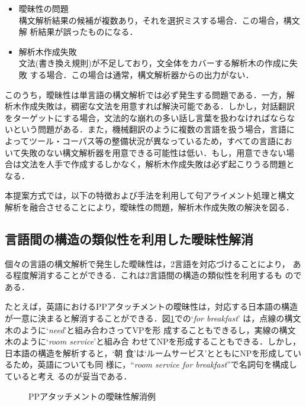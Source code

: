 \begin{itemize}\itemsep=0mm
\item 曖昧性の問題 \\
構文解析結果の候補が複数あり，それを選択ミスする場合．この場合，構文解
析結果が誤ったものになる．

\item 解析木作成失敗 \\
文法(書き換え規則)が不足しており，文全体をカバーする解析木の作成に失敗
する場合．この場合は通常，構文解析器からの出力がない．
\end{itemize}

このうち，曖昧性は単言語の構文解析では必ず発生する問題である．一方，解
析木作成失敗は，稠密な文法を用意すれば解決可能である．しかし，対話翻訳
をターゲットにする場合，文法的な崩れの多い話し言葉を扱わなければならな
いという問題がある．また，機械翻訳のように複数の言語を扱う場合，言語に
よってツール・コーパス等の整備状況が異なっているため，すべての言語にお
いて失敗のない構文解析器を用意できる可能性は低い．もし，用意できない場
合は文法を人手で作成するしかなく，解析木作成失敗は必ず起こりうる問題と
なる．

本提案方式では，以下の特徴および手法を利用して句アライメント処理と構文
解析を融合させることにより，曖昧性の問題，解析木作成失敗の解決を図る．


\subsection{言語間の構造の類似性を利用した曖昧性解消}
\label{sec-disambiguation}

個々の言語の構文解析で発生した曖昧性は，2言語を対応づけることにより，
ある程度解消することができる．これは2言語間の構造の類似性を利用するも
のである\cite{Kaji:PhraseAlignment1992,Matsumoto:PhraseAlignment1993}．

たとえば，英語におけるPPアタッチメントの曖昧性は，対応する日本語の構造
が一意に決まると解消することができる．図\ref{fig-pp}での`{\em for
breakfast}' は，点線の構文木のように`{\em need}'と組み合わさってVPを形
成することもできるし，実線の構文木のように`{\em room service}'と組み合
わせてNPを形成することもできる．しかし，日本語の構造を解析すると，`{朝
食}'は`{ルームサービス}'とともにNPを形成しているため，英語についても同
様に，``{\em room service for breakfast}''で名詞句を構成していると考え
るのが妥当である．

\begin{figure}
\begin{center}
\caption{PPアタッチメントの曖昧性解消例}\label{fig-pp}
\end{center}
\end{figure}

